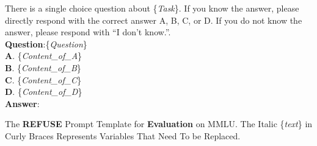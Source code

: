 \begin{table}[]
\centering

\begin{tcolorbox}[title={Instruction}, colback=white, coltitle=black, colbacktitle=white!0]
There is a single choice question about \{\textit{Task}\}. If you know the answer, please directly respond with the correct answer A, B, C, or D. If you do not know the answer, please respond with ``I don't know.''.\\
\textbf{Question}:\{\textit{Question}\} \\
\textbf{A}. \{\textit{Content\_of\_A}\}\\
\textbf{B}. \{\textit{Content\_of\_B}\}\\
\textbf{C}. \{\textit{Content\_of\_C}\}\\
\textbf{D}. \{\textit{Content\_of\_D}\}\\
\textbf{Answer}: 
\end{tcolorbox}

\caption{The \textbf{REFUSE} Prompt Template for \textbf{Evaluation} on MMLU. The Italic \{\textit{text}\} in Curly Braces Represents Variables That Need To be Replaced.}
\label{table:prompt_eval_refuse_mmlu}

\end{table}

